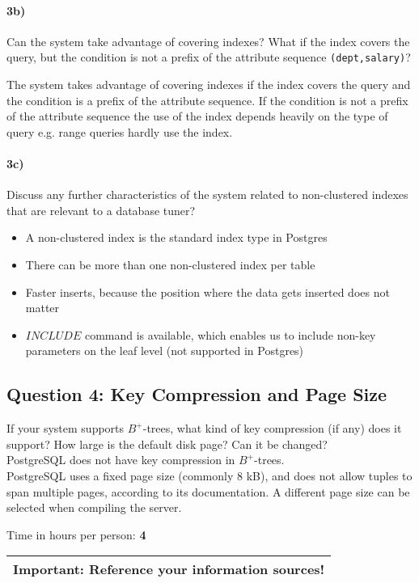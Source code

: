 \documentclass[11pt]{scrartcl}
\begin{document}
\paragraph{3b)} Can the system take advantage of covering indexes? What if the
index covers the query, but the condition is not a prefix of the
attribute sequence {\tt (dept,salary)}?

The system takes advantage of covering indexes if the index covers the query and the condition is a prefix of the attribute sequence. If the condition is not a prefix of the attribute sequence the use of the index depends heavily on the type of query e.g. range queries hardly use the index.

\paragraph{3c)} Discuss any further characteristics of the system related to
non-clustered indexes that are relevant to a database tuner?

\begin{itemize}
 \item A non-clustered index is the standard index type in Postgres
 \item There can be more than one non-clustered index per table
 \item Faster inserts, because the position where the data gets inserted does not matter
 \item $INCLUDE$ command is available, which enables us to include non-key parameters on the leaf level (not supported in Postgres)
\end{itemize}

\subsection*{Question 4: Key Compression and Page Size} If your system
supports $B^+$-trees, what kind of key compression (if any) does it
support?  How large is the default disk page? Can it be changed?
\\
PostgreSQL does not have key compression in $B^+$-trees.\\
PostgreSQL uses a fixed page size (commonly 8 kB), and does not allow tuples to span multiple pages, according to its documentation.
A different page size can be selected when compiling the server.
\smallskip

\bigskip

\noindent Time in hours per person: {\bf 4}

\bigskip

\begin{center}
  \begin{tabular}{c}
    \hline
    {\bf Important:} Reference your information sources!
    \\\hline
  \end{tabular}
\end{center}
\end{document}
